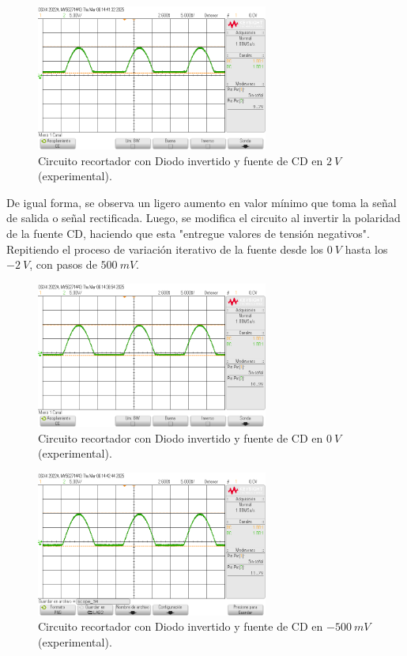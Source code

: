 \documentclass[journal]{IEEEtran}
\begin{document}
\begin{figure}[H]
        \centering
        \includegraphics[width=3in]{SignalExperimental_15.png}
        \caption{Circuito recortador con Diodo invertido y fuente de CD en $2~V$ (experimental).}
        \label{fig:SignalExperimental_15}
\end{figure}

De igual forma, se observa un ligero aumento en valor mínimo que toma la señal de salida o señal rectificada.
Luego, se modifica el circuito al invertir la polaridad de la fuente CD, haciendo que esta "entregue valores de tensión negativos".
Repitiendo el proceso de variación iterativo de la fuente desde los $0~V$ hasta los $-2~V$, con pasos de $500~mV$.
\begin{figure}[H]
        \centering
        \includegraphics[width=3in]{SignalExperimental_11.png}
        \caption{Circuito recortador con Diodo invertido y fuente de CD en $0~V$ (experimental).}
        \label{fig:SignalExperimental_16}
\end{figure}
\begin{figure}[H]
        \centering
        \includegraphics[width=3in]{SignalExperimental_16.png}
        \caption{Circuito recortador con Diodo invertido y fuente de CD en $-500~mV$ (experimental).}
        \label{fig:SignalExperimental_17}
\end{figure}
\end{document}
